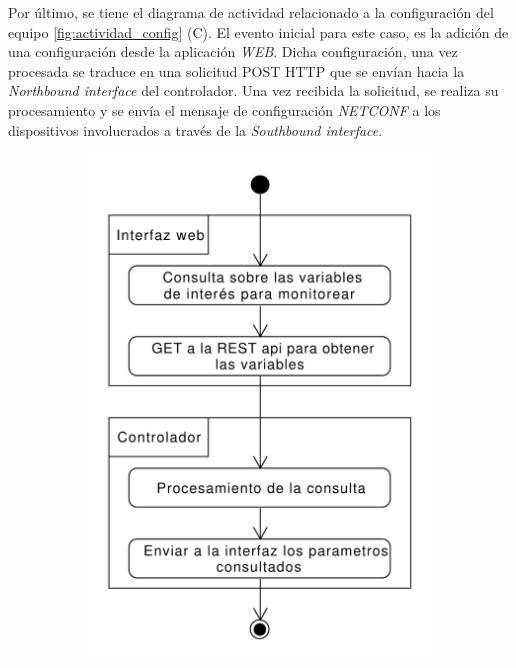Por último, se tiene el diagrama de actividad relacionado a la configuración del equipo \ref{fig:actividad_config} (C). El evento inicial para este caso, es la adición de una configuración desde la aplicación \textit{WEB}. Dicha configuración, una vez procesada se traduce en una solicitud POST HTTP que se envían hacia la \textit{Northbound interface} del controlador. Una vez recibida la solicitud, se realiza su procesamiento y se envía el mensaje de configuración \textit{NETCONF} a los dispositivos involucrados a través de la \textit{Southbound interface}.


  


  \begin{figure}[!h]
    \centering
    \begin{subfigure}[b]{0.43\textwidth}
        \centering
        \includegraphics[width=\textwidth]{Figures/actividad_monitoreo.pdf}

\end{subfigure}
\end{figure}
